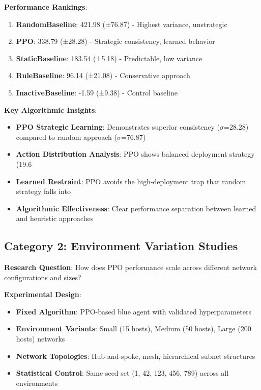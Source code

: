 \documentclass[12pt,twoside]{article}
\begin{document}
\textbf{Performance Rankings}:
\begin{enumerate}
\item \textbf{RandomBaseline}: 421.98 (±76.87) - Highest variance, unstrategic
\item \textbf{PPO}: 338.79 (±28.28) - Strategic consistency, learned behavior  
\item \textbf{StaticBaseline}: 183.54 (±5.18) - Predictable, low variance
\item \textbf{RuleBaseline}: 96.14 (±21.08) - Conservative approach
\item \textbf{InactiveBaseline}: -1.59 (±9.38) - Control baseline
\end{enumerate}

\textbf{Key Algorithmic Insights}:
\begin{itemize}
\item \textbf{PPO Strategic Learning}: Demonstrates superior consistency ($\sigma$=28.28) compared to random approach ($\sigma$=76.87)
\item \textbf{Action Distribution Analysis}: PPO shows balanced deployment strategy (19.6%
\item \textbf{Learned Restraint}: PPO avoids the high-deployment trap that random strategy falls into
\item \textbf{Algorithmic Effectiveness}: Clear performance separation between learned and heuristic approaches
\end{itemize}

\subsection{Category 2: Environment Variation Studies}

\textbf{Research Question}: How does PPO performance scale across different network configurations and sizes?

\textbf{Experimental Design}:
\begin{itemize}
\item \textbf{Fixed Algorithm}: PPO-based blue agent with validated hyperparameters
\item \textbf{Environment Variants}: Small (15 hosts), Medium (50 hosts), Large (200 hosts) networks
\item \textbf{Network Topologies}: Hub-and-spoke, mesh, hierarchical subnet structures
\item \textbf{Statistical Control}: Same seed set (1, 42, 123, 456, 789) across all environments
\end{itemize}
\end{document}
